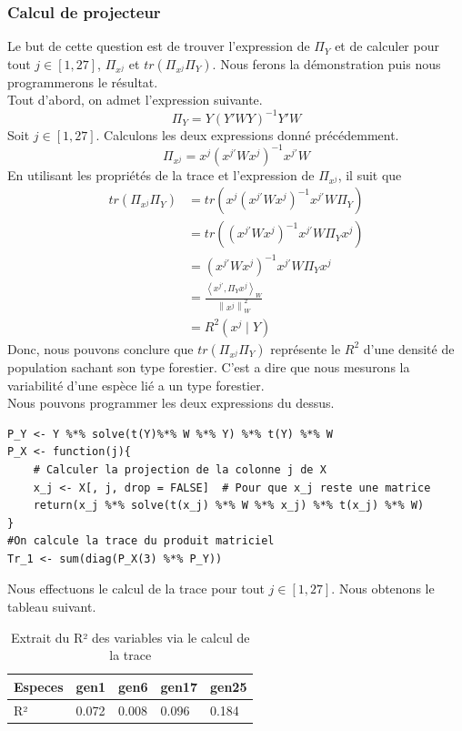 \documentclass{article}
\begin{document}
\subsubsection{Calcul de projecteur}
Le but de cette question est de trouver l'expression
de $\Pi_Y$ et de calculer pour tout $j \in [1,27]$, $\Pi_{x^{j}}$ et $tr(\Pi_{x^{j}}\Pi_Y)$. Nous ferons la démonstration
puis nous programmerons le résultat. \\
Tout d'abord, on admet l'expression suivante.
\[
\Pi_Y = Y(Y'WY)^{-1}Y'W
\]
Soit $j \in [1,27]$. Calculons les deux expressions donné précédemment.
\[
\Pi_{x^j}= x^{j}(x^{j\prime}Wx^{j})^{-1}x^{j\prime}W
\]
En utilisant les propriétés de la trace et l'expression de $\Pi_{x^j}$, il suit que 
\begin{align*}
    tr(\Pi_{x^{j}}\Pi_Y) &= tr(x^{j}(x^{j\prime}Wx^{j})^{-1}x^{j\prime}W\Pi_Y) \\
    &=tr((x^{j\prime}Wx^{j})^{-1}x^{j\prime}W\Pi_Yx^{j})\\
    &=(x^{j\prime}Wx^{j})^{-1}x^{j\prime}W\Pi_Yx^{j}\\
    &= \frac{\left\langle x^{j\prime},\Pi_Yx^{j}\right\rangle_W }{\left\lVert x^j\right\rVert^2_W }\\
    &= R^2(x^j\mid Y )
\end{align*}
Donc, nous pouvons conclure que $tr(\Pi_{x^{j}}\Pi_Y)$ représente le $R^2$ d'une densité de population sachant son type forestier. C'est a dire que nous 
mesurons la variabilité d'une espèce lié a un type forestier. \\
Nous pouvons programmer les deux expressions du dessus. \\
\begin{lstlisting}[caption=Extrait du code R, label= Question 1b]
P_Y <- Y %*% solve(t(Y)%*% W %*% Y) %*% t(Y) %*% W
P_X <- function(j){
    # Calculer la projection de la colonne j de X
    x_j <- X[, j, drop = FALSE]  # Pour que x_j reste une matrice
    return(x_j %*% solve(t(x_j) %*% W %*% x_j) %*% t(x_j) %*% W)
}
#On calcule la trace du produit matriciel
Tr_1 <- sum(diag(P_X(3) %*% P_Y))
\end{lstlisting}
Nous effectuons le calcul de la trace pour tout $j \in [1,27]$. Nous obtenons le tableau suivant. 
\begin{table}[H]
    \centering
    \begin{tabular}{|l|l|l|l|l|}
    \hline
    Especes & gen1  & gen6  & gen17 & gen25 \\ \hline
    R²      & 0.072 & 0.008 & 0.096 & 0.184 \\ \hline
    \end{tabular}
    \centering
    \caption{Extrait du R² des variables via le calcul de la trace}
    \label{tab:statistiques 1.b}
\end{table}
\end{document}

